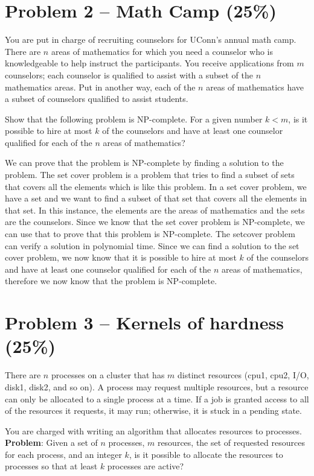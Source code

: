 \documentclass[12pt,letterpaper]{article}
\begin{document}
\section*{Problem 2 -- Math Camp (25\%)}
You are put in charge of recruiting counselors for UConn's annual math camp.
There are $n$ areas of mathematics for which you need a counselor who is knowledgeable to help instruct the participants.
You receive applications from $m$ counselors; each counselor is qualified to assist with a subset of the $n$ mathematics areas.
Put in another way, each of the $n$ areas of mathematics have a subset of counselors qualified to assist students.

Show that the following problem is NP-complete.
For a given number $k<m$, is it possible to hire at most $k$ of the counselors and have at least one counselor qualified for each of the $n$ areas of mathematics?

We can prove that the problem is NP-complete by finding a solution to the problem. The set cover problem is a problem that tries to find a subset of sets that covers all the elements which is like this problem. In a set cover problem, we have a set and we want to find a subset of that set that covers all the elements in that set. In this instance, the elements are the areas of mathematics and the sets are the counselors. Since we know that the set cover problem is NP-complete, we can use that to prove that this problem is NP-complete. The setcover problem can verify a solution in polynomial time. Since we can find a solution to the set cover problem, we now know that it is possible to hire at most $k$ of the counselors and have at least one counselor qualified for each of the $n$ areas of mathematics, therefore we now know that the problem is NP-complete. 


\section*{Problem 3 -- Kernels of hardness (25\%)}
There are $n$ processes on a cluster that has $m$ distinct resources (cpu1, cpu2, I/O, disk1, disk2, and so on).
A process may request multiple resources, but a resource can only be allocated to a single process at a time.
If a job is granted access to all of the resources it requests, it may run; otherwise, it is stuck in a pending state.

You are charged with writing an algorithm that allocates resources to processes.
\textbf{Problem}: Given a set of $n$ processes, $m$ resources, the set of requested resources for each process, and an integer $k$, is it possible to allocate the resources to processes so that at least $k$ processes are active?
\end{document}
